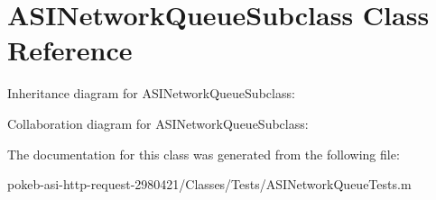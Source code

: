 \hypertarget{interface_a_s_i_network_queue_subclass}{
\section{\-A\-S\-I\-Network\-Queue\-Subclass \-Class \-Reference}
\label{interface_a_s_i_network_queue_subclass}
}


\-Inheritance diagram for \-A\-S\-I\-Network\-Queue\-Subclass\-:


\-Collaboration diagram for \-A\-S\-I\-Network\-Queue\-Subclass\-:


\-The documentation for this class was generated from the following file\-:\begin{DoxyCompactItemize}
\item 
pokeb-\/asi-\/http-\/request-\/2980421/\-Classes/\-Tests/\-A\-S\-I\-Network\-Queue\-Tests.\-m\end{DoxyCompactItemize}
